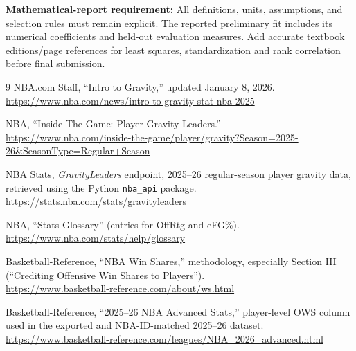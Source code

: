 \documentclass[11pt]{article}
\begin{document}
\textbf{Mathematical-report requirement:} All definitions, units,
assumptions, and selection rules must remain explicit. The reported
preliminary fit includes its numerical coefficients and held-out
evaluation measures. Add accurate textbook editions/page references for
least squares, standardization and rank correlation before final submission.

\begin{thebibliography}{9}
NBA.com Staff, ``Intro to Gravity,'' updated January 8, 2026. \\
\url{https://www.nba.com/news/intro-to-gravity-stat-nba-2025}

NBA, ``Inside The Game: Player Gravity Leaders.'' \\
\url{https://www.nba.com/inside-the-game/player/gravity?Season=2025-26&SeasonType=Regular+Season}

NBA Stats, \emph{GravityLeaders} endpoint, 2025--26 regular-season player
gravity data, retrieved using the Python \texttt{nba\_api} package.
\url{https://stats.nba.com/stats/gravityleaders}

NBA, ``Stats Glossary'' (entries for OffRtg and eFG\%). \\
\url{https://www.nba.com/stats/help/glossary}

Basketball-Reference, ``NBA Win Shares,'' methodology, especially Section III
(``Crediting Offensive Win Shares to Players''). \\
\url{https://www.basketball-reference.com/about/ws.html}

Basketball-Reference, ``2025--26 NBA Advanced Stats,'' player-level OWS
column used in the exported and NBA-ID-matched 2025--26 dataset. \\
\url{https://www.basketball-reference.com/leagues/NBA_2026_advanced.html}
\end{thebibliography}
\end{document}
